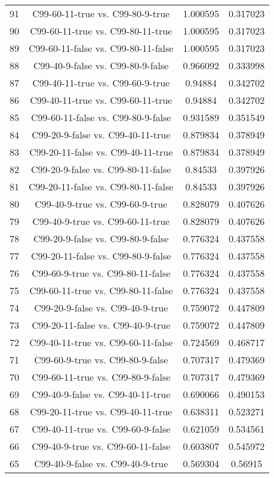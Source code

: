 \documentclass[a4paper,10pt]{article}
\begin{document}
\begin{landscape}
\begin{table}[!htp]
\begin{tabular}{cccc}
91&C99-60-11-true vs. C99-80-9-true&1.000595&0.317023\\
90&C99-60-11-true vs. C99-80-11-true&1.000595&0.317023\\
89&C99-60-11-false vs. C99-80-11-false&1.000595&0.317023\\
88&C99-40-9-false vs. C99-80-9-false&0.966092&0.333998\\
87&C99-40-11-true vs. C99-60-9-true&0.94884&0.342702\\
86&C99-40-11-true vs. C99-60-11-true&0.94884&0.342702\\
85&C99-60-11-false vs. C99-80-9-false&0.931589&0.351549\\
84&C99-20-9-false vs. C99-40-11-true&0.879834&0.378949\\
83&C99-20-11-false vs. C99-40-11-true&0.879834&0.378949\\
82&C99-20-9-false vs. C99-80-11-false&0.84533&0.397926\\
81&C99-20-11-false vs. C99-80-11-false&0.84533&0.397926\\
80&C99-40-9-true vs. C99-60-9-true&0.828079&0.407626\\
79&C99-40-9-true vs. C99-60-11-true&0.828079&0.407626\\
78&C99-20-9-false vs. C99-80-9-false&0.776324&0.437558\\
77&C99-20-11-false vs. C99-80-9-false&0.776324&0.437558\\
76&C99-60-9-true vs. C99-80-11-false&0.776324&0.437558\\
75&C99-60-11-true vs. C99-80-11-false&0.776324&0.437558\\
74&C99-20-9-false vs. C99-40-9-true&0.759072&0.447809\\
73&C99-20-11-false vs. C99-40-9-true&0.759072&0.447809\\
72&C99-40-11-true vs. C99-60-11-false&0.724569&0.468717\\
71&C99-60-9-true vs. C99-80-9-false&0.707317&0.479369\\
70&C99-60-11-true vs. C99-80-9-false&0.707317&0.479369\\
69&C99-40-9-false vs. C99-40-11-true&0.690066&0.490153\\
68&C99-20-11-true vs. C99-40-11-true&0.638311&0.523271\\
67&C99-40-11-true vs. C99-60-9-false&0.621059&0.534561\\
66&C99-40-9-true vs. C99-60-11-false&0.603807&0.545972\\
65&C99-40-9-false vs. C99-40-9-true&0.569304&0.56915\\

\end{tabular}
\end{table}
\end{landscape}
\end{document}
